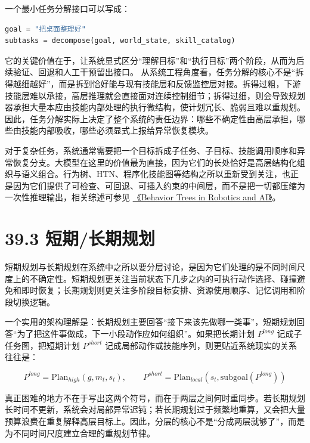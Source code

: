 一个最小任务分解接口可以写成：

\begin{lstlisting}[language=python]
goal = "把桌面整理好"
subtasks = decompose(goal, world_state, skill_catalog)
\end{lstlisting}

它的关键价值在于，让系统显式区分“理解目标”和“执行目标”两个阶段，从而为后续验证、回退和人工干预留出接口。 从系统工程角度看，任务分解的核心不是“拆得越细越好”，而是拆到恰好能与现有技能层和反馈监控层对接。拆得过粗，下游技能层难以承接，高层推理就会直接面对连续控制细节；拆得过细，则会导致规划器承担大量本应由技能内部处理的执行微结构，使计划冗长、脆弱且难以重规划。因此，任务分解实际上决定了整个系统的责任边界：哪些不确定性由高层承担，哪些由技能内部吸收，哪些必须显式上报给异常恢复模块。

对于复杂任务，系统通常需要把一个目标拆成子任务、子目标、技能调用顺序和异常恢复分支。大模型在这里的价值最为直接，因为它们的长处恰好是高层结构化组织与语义组合。行为树、HTN、程序化技能图等结构之所以重新受到关注，也正是因为它们提供了可检查、可回退、可插入约束的中间层，而不是把一切都压缩为一次性推理输出，相关综述可参见 \href{https://arxiv.org/abs/1709.00084}{《Behavior Trees in Robotics and AI》}。

\section*{39.3 短期/长期规划}


短期规划与长期规划在系统中之所以要分层讨论，是因为它们处理的是不同时间尺度上的不确定性。短期规划更关注当前状态下几步之内的可执行动作选择、碰撞避免和即时恢复；长期规划则更关注多阶段目标安排、资源使用顺序、记忆调用和阶段切换逻辑。

一个实用的架构理解是：长期规划主要回答“接下来该先做哪一类事”，短期规划回答“为了把这件事做成，下一小段动作应如何组织”。如果把长期计划 \(P^{long}\) 记成子任务图，把短期计划 \(P^{short}\) 记成局部动作或技能序列，则更贴近系统现实的关系往往是：

\begingroup
\scriptsize
\begin{equation*}
P^{long} = \mathrm{Plan}_{high}(g, m_t, s_t), \qquad
P^{short} = \mathrm{Plan}_{local}(s_t, \text{subgoal}(P^{long}))
\end{equation*}
\endgroup

真正困难的地方不在于写出这两个符号，而在于两层之间何时重同步。若长期规划长时间不更新，系统会对局部异常迟钝；若长期规划过于频繁地重算，又会把大量预算浪费在重复解释高层目标上。因此，分层的核心不是“分成两层就够了”，而是为不同时间尺度建立合理的重规划节律。

